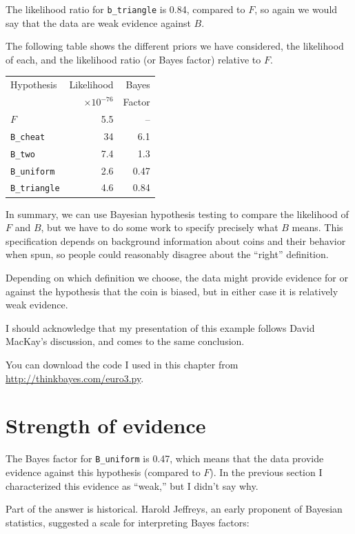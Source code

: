 \documentclass[12pt]{book}
\begin{document}
The likelihood ratio for \verb"b_triangle" is 0.84, compared to $F$, so
again we would say that the data are weak evidence against $B$.

The following table shows the different priors we have considered, the
likelihood of each, and the likelihood ratio (or Bayes factor)
relative to $F$.

\begin{tabular}{|l|r|r|}
\hline
Hypothesis   & Likelihood & Bayes  \\
             & $\times 10^{-76}$ & Factor  \\
\hline
$F$              & 5.5   & --   \\
\verb"B_cheat"  & 34   &  6.1   \\
\verb"B_two"     & 7.4   &  1.3   \\
\verb"B_uniform"  & 2.6   &  0.47   \\
\verb"B_triangle"  & 4.6   &  0.84   \\
\hline
\end{tabular}

In summary, we can use Bayesian hypothesis testing to compare the
likelihood of $F$ and $B$, but we have to do some work to specify
precisely what $B$ means.  This specification depends on background
information about coins and their behavior when spun, so people
could reasonably disagree about the ``right'' definition.

Depending on which definition we choose, the data might provide
evidence for or against the hypothesis that the coin is biased, but
in either case it is relatively weak evidence.

I should acknowledge that my presentation of this example follows
David MacKay's discussion, and comes to the same conclusion.

You can download the code I used in this chapter from
\url{http://thinkbayes.com/euro3.py}.


\section{Strength of evidence}

The Bayes factor for \verb"B_uniform" is 0.47, which means
that the data provide evidence against this hypothesis (compared
to $F$).  In the previous section I characterized this evidence
as ``weak,'' but I didn't say why.

Part of the answer is historical.  Harold Jeffreys, an early
proponent of Bayesian statistics, suggested a scale for
interpreting Bayes factors:
\end{document}
